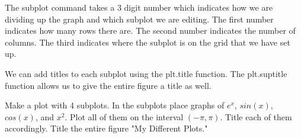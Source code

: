 The subplot command takes a 3 digit number which indicates how we are dividing up the graph and which subplot we are editing. The first number indicates how many rows there are. The second number indicates the number of columns. The third indicates where the subplot is on the grid that we have set up. 

We can add titles to each subplot using the plt.title function. The plt.suptitle function allows us to give the entire figure a title as well.

\begin{problem}
Make a plot with 4 subplots. In the subplots place graphs of $e^x$, $sin(x)$, $cos(x)$, and $x^2$. Plot all of them on the interval $(-\pi,\pi)$. Title each of them accordingly. Title the entire figure "My Different Plots."
\end{problem}